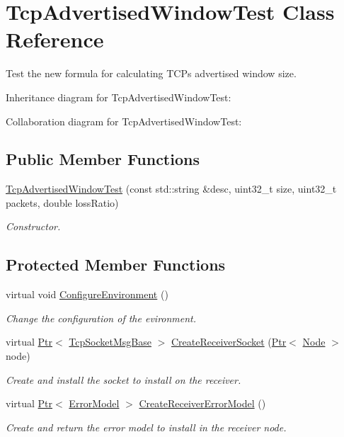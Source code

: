 \hypertarget{classTcpAdvertisedWindowTest}{}\section{Tcp\+Advertised\+Window\+Test Class Reference}
\label{classTcpAdvertisedWindowTest}


Test the new formula for calculating T\+CP\textquotesingle{}s advertised window size.  




Inheritance diagram for Tcp\+Advertised\+Window\+Test\+:


Collaboration diagram for Tcp\+Advertised\+Window\+Test\+:
\subsection*{Public Member Functions}
\begin{DoxyCompactItemize}
\item 
\hyperlink{classTcpAdvertisedWindowTest_ab1af145e0a8ca5b17c0d196d6c3ce5cd}{Tcp\+Advertised\+Window\+Test} (const std\+::string \&desc, uint32\+\_\+t size, uint32\+\_\+t packets, double loss\+Ratio)
\begin{DoxyCompactList}\small\item\em Constructor. \end{DoxyCompactList}\end{DoxyCompactItemize}
\subsection*{Protected Member Functions}
\begin{DoxyCompactItemize}
\item 
virtual void \hyperlink{classTcpAdvertisedWindowTest_a32f6b3ef9a883c098a69ed55dbf21630}{Configure\+Environment} ()
\begin{DoxyCompactList}\small\item\em Change the configuration of the evironment. \end{DoxyCompactList}\item 
virtual \hyperlink{classns3_1_1Ptr}{Ptr}$<$ \hyperlink{classns3_1_1TcpSocketMsgBase}{Tcp\+Socket\+Msg\+Base} $>$ \hyperlink{classTcpAdvertisedWindowTest_a322099457f41afb575f67f795001e54a}{Create\+Receiver\+Socket} (\hyperlink{classns3_1_1Ptr}{Ptr}$<$ \hyperlink{classns3_1_1Node}{Node} $>$ node)
\begin{DoxyCompactList}\small\item\em Create and install the socket to install on the receiver. \end{DoxyCompactList}\item 
virtual \hyperlink{classns3_1_1Ptr}{Ptr}$<$ \hyperlink{classns3_1_1ErrorModel}{Error\+Model} $>$ \hyperlink{classTcpAdvertisedWindowTest_af3323a980175664995c2a6a70594f6ce}{Create\+Receiver\+Error\+Model} ()
\begin{DoxyCompactList}\small\item\em Create and return the error model to install in the receiver node. \end{DoxyCompactList}\end{DoxyCompactItemize}
